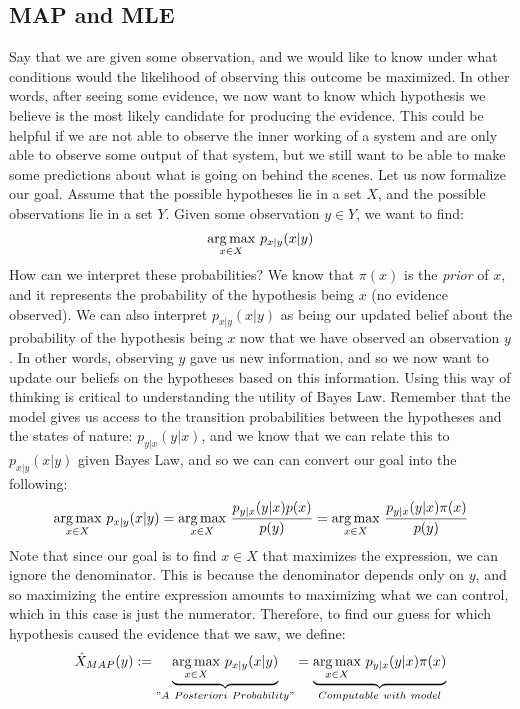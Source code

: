 \subsection{MAP and MLE}
Say that we are given some observation, and we would like to know under what conditions would the likelihood of observing this outcome be maximized. In other words, after seeing some evidence, we now want to know which hypothesis we believe is the most likely candidate for producing the evidence. This could be helpful if we are not able to observe the inner working of a system and are only able to observe some output of that system, but we still want to be able to make some predictions about what is going on behind the scenes. Let us now formalize our goal. Assume that the possible hypotheses lie in a set \(X\), and the possible observations lie in a set \(Y\). Given some observation \(y \in Y\), we want to find:
\begin{equation*}
  \underset{x \in X}{\operatorname*{arg\,max}}\ p_{x|y}(x|y)
\end{equation*}
How can we interpret these probabilities? We know that \(\pi(x)\) is the \textit{prior} of \(x\), and it represents the probability of the hypothesis being \(x\) (no evidence observed). We can also interpret \(p_{x|y}(x|y)\) as being our updated belief about the probability of the hypothesis being \(x\) now that we have observed an observation \(y\). In other words, observing \(y\) gave us new information, and so we now want to update our beliefs on the hypotheses based on this information. Using this way of thinking is critical to understanding the utility of Bayes Law. Remember that the model gives us access to the transition probabilities between the hypotheses and the states of nature: \(p_{y|x}(y|x)\), and we know that we can relate this to \(p_{x|y}(x|y)\) given Bayes Law, and so we can can convert our goal into the following:
\begin{equation*}
  \underset{x\in X}{\operatorname*{arg\,max}}\ p_{x|y}(x|y) = \underset{x \in X}{\operatorname*{arg\,max}}\ \frac{p_{y|x}(y|x)p(x)}{p(y)} = \underset{x\in X}{\operatorname*{arg\,max}}\  \frac{p_{y|x}(y|x)\pi(x)}{p(y)}
\end{equation*}
Note that since our goal is to find \(x\in X\) that maximizes the expression, we can ignore the denominator. This is because the denominator depends only on \(y\), and so maximizing the entire expression amounts to maximizing what we can control, which in this case is just the numerator. Therefore, to find our guess for which hypothesis caused the evidence that we saw, we define:
\begin{equation*}
  {\hat{X}_{MAP}} (y) := \underbrace{\underset{x \in X}{\operatorname*{arg\,max}}\ p_{x|y}(x|y)}_{"A\ Posteriori \ Probability"} = \underbrace{\underset{x\in X}{\operatorname*{arg\,max}}\ p_{y|x}(y|x)\pi(x)}_{Computable \ with \ model}
\end{equation*}
